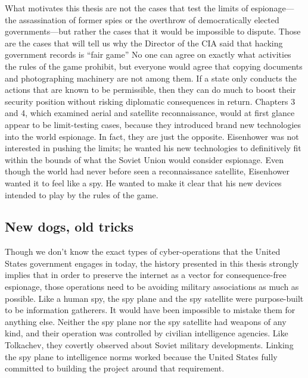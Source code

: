\documentclass{report}
\begin{document}

What motivates this thesis are not the cases that test the limits of espionage---the assassination of former spies or the overthrow of democratically elected governments---but rather the cases that it would be impossible to dispute. Those are the cases that will tell us why the Director of the CIA said that hacking government records is ``fair game'' No one can agree on exactly what activities the rules of the game prohibit, but everyone would agree that copying documents and photographing machinery are not among them. If a state only conducts the actions that are known to be permissible, then they can do much to boost their security position without risking diplomatic consequences in return. Chapters 3 and 4, which examined aerial and satellite reconnaissance, would at first glance appear to be limit-testing cases, because they introduced brand new technologies into the world espionage. In fact, they are just the opposite. Eisenhower was not interested in pushing the limits; he wanted his new technologies to definitively fit within the bounds of what the Soviet Union would consider espionage. Even though the world had never before seen a reconnaissance satellite, Eisenhower wanted it to feel like a spy. He wanted to make it clear that his new devices intended to play by the rules of the game.

\subsection{New dogs, old tricks}
Though we don't know the exact types of cyber-operations that the United States government engages in today, the history presented in this thesis strongly implies that in order to preserve the internet as a vector for consequence-free espionage, those operations need to be avoiding military associations as much as possible. Like a human spy, the spy plane and the spy satellite were purpose-built to be information gatherers. It would have been impossible to mistake them for anything else. Neither the spy plane nor the spy satellite had weapons of any kind, and their operation was controlled by civilian intelligence agencies. Like Tolkachev, they covertly observed about Soviet military developments. Linking the spy plane to intelligence norms worked because the United States fully committed to building the project around that requirement.
\end{document}
